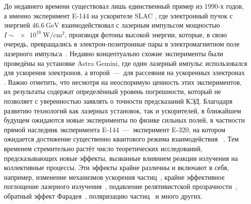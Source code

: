 До недавнего времени существовал лишь единственный пример из 1990-х годов, а именно эксперимент E-144 на ускорителе SLAC , где электронный пучок с энергией $\SI{46.6}{\giga\electronvolt}$ взаимодействовал с лазерным импульсом мощностью ${I\sim\SI{e18}{\watt/\centi\meter^2}}$, производя фотоны высокой энергии, которые, в свою очередь, превращались в электрон-позитронные пары в электромагнитном поле лазерного импульса~\cite{bula1996observation, burke1997positron}.
Недавно концептуально схожие  эксперименты были проведёны на установке Astra Gemini, где один лазерный импульс использовался для ускорения электронов, а второй~---~для рассеяния на ускоренных электронах~\cite{Poder17, Cole17} .
Важно отметить, что несмотря на неоспоримую ценность этих экспериментов, их результаты содержат определённый уровень погрешности, который не позволяет с уверенностью заявлять о точности предсказаний КЭД.
Благодаря развитию технологий как лазерных установок, так и ускорителей, в ближайшем будущем ожидаются новые эксперименты по физике сильных полей, в частности прямой наследник эксперимента E-144~---~эксперимент E-320, на котором ожидается достижение существенно квантового режима взаимодействия~\cite{meuren2019probing} .
Тем временем стремительно растёт число теоретических исследований, предсказывающих новые эффекты, вызванные влиянием реакции излучения на коллективные процессы.
Эти эффекты крайне различны и включают в себя, например, изменение механизмов ускорения частиц~\cite{Tamburini10, Tamburini12, kostyukov2012radiative, Capdessus12, Capdessus15, Nerush15, Gelfer18a, Gelfer18b, gelfer2021ions, golovanov2021radiation},
крайне эффективное поглощение лазерного излучения~\cite{grismayer2016laser},
подавление релятивистской прозрачности~\cite{Zhang15, serebryakov2022opacity},
обратный эффект Фарадея~\cite{Liseykina16,liseykina2021IFE},
поляризацию частиц~\cite{DelSorbo2017Spin,DelSorbo2018spin,Chen2019spin,Seipt2019spin,Wu2019spin,li2019ultrarelativistic,Li2020spin,Wan2020spin,gong2021retrieving} и много других.

